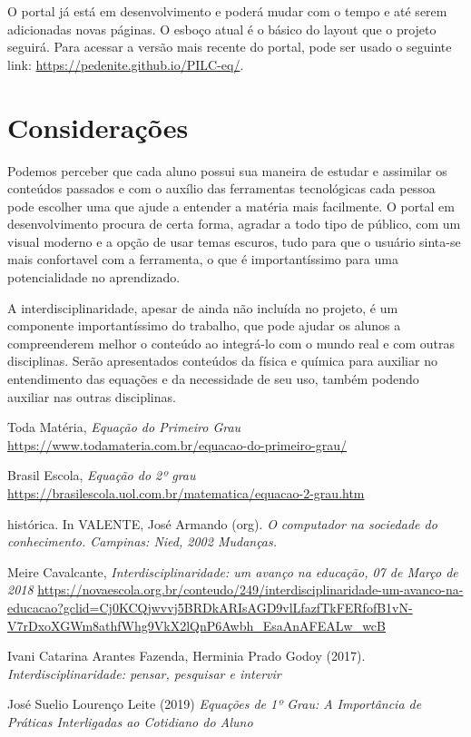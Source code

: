 \documentclass[12pt]{report}
\begin{document}
O portal já está em desenvolvimento e poderá mudar com o tempo e até serem adicionadas novas páginas. O esboço atual é o básico do layout que o projeto seguirá. Para acessar a versão mais recente do portal, pode ser usado o seguinte link: \url{https://pedenite.github.io/PILC-eq/}.

\chapter{Considerações}
Podemos perceber que cada aluno possui sua maneira de estudar e assimilar os conteúdos passados e com o auxílio das ferramentas tecnológicas cada pessoa pode escolher uma que ajude a entender a matéria mais facilmente. O portal em desenvolvimento procura de certa forma, agradar a todo tipo de público, com um visual moderno e a opção de usar temas escuros, tudo para que o usuário sinta-se mais confortavel com a ferramenta, o que é importantíssimo para uma potencialidade no aprendizado.

A interdisciplinaridade, apesar de ainda não incluída no projeto, é um componente importantíssimo do trabalho, que pode ajudar os alunos a compreenderem melhor o conteúdo ao integrá-lo com o mundo real e com outras disciplinas. Serão apresentados conteúdos da física e química para auxiliar no entendimento das equações e da necessidade de seu uso, também podendo auxiliar nas outras disciplinas.

\begin{thebibliography}{9}

\noindent Toda Matéria, 
\textit{Equação do Primeiro Grau}
\url{https://www.todamateria.com.br/equacao-do-primeiro-grau/}

\noindent Brasil Escola, 
\textit{Equação do 2º grau}
\url{https://brasilescola.uol.com.br/matematica/equacao-2-grau.htm}

\noindent histórica. In VALENTE, José Armando (org). 
\textit{O computador na sociedade do conhecimento. Campinas: Nied, 2002 Mudanças.}

\noindent Meire Cavalcante,
\textit{Interdisciplinaridade: um avanço na educação, 07 de Março de 2018}
\url{https://novaescola.org.br/conteudo/249/interdisciplinaridade-um-avanco-na-educacao?gclid=Cj0KCQjwvvj5BRDkARIsAGD9vlLfazfTkFERfofB1vN-V7rDxoXGWm8athfWhg9VkX2lQnP6Awbh_EsaAnAFEALw_wcB}

\noindent Ivani Catarina Arantes Fazenda, Herminia Prado Godoy (2017).
\textit{Interdisciplinaridade: pensar, pesquisar e intervir}

\noindent José Suelio Lourenço Leite (2019)
\textit{Equações de 1º Grau: A Importância de Práticas Interligadas ao Cotidiano do Aluno}

\end{thebibliography}
\end{document}
